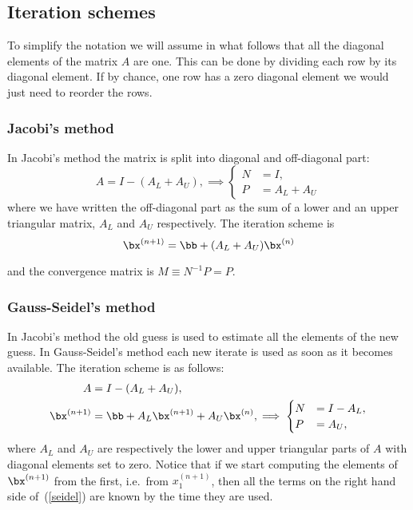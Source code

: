 \subsection{Iteration schemes}

To simplify the notation we will assume in what follows that all the
diagonal elements of the matrix $A$ are one.   This can be done by
dividing each row by its diagonal element.   If by chance, one row has
a zero diagonal element we would just need to reorder the rows.

\subsubsection{Jacobi's method}

In Jacobi's method the matrix is split into diagonal and off-diagonal
part:
%
\begin{equation*}
  A = I - ( A_L + A_U ) , \implies
  \begin{cases}
    N &= I , \\ P &= A_L+A_U
  \end{cases}
\end{equation*}
%
where we have written the off-diagonal part as the sum of a lower and
an upper triangular matrix, $A_L$ and $A_U$ respectively.   The iteration
scheme is
%
\begin{equation*}
  \bx^{(n+1)} = \bb + ( A_L + A_U ) \bx^{(n)}
\end{equation*}

%
and the convergence matrix is $M \equiv N^{-1} P = P$.

\subsubsection{Gauss-Seidel's method}

In Jacobi's method the old guess is used to estimate all the
elements of the new guess.   In Gauss-Seidel's method each new iterate
is used as soon as it becomes available.    The iteration scheme is as
follows:
%
\begin{align}
  A &= I - (A_L+A_U) , \nonumber \\
  \bx^{(n+1)} &= \bb + A_L \bx^{(n+1)} + A_U \bx^{(n)} , \implies
  \begin{cases}
    N &= I - A_L , \\ P &= A_U ,
  \end{cases}
  \label{seidel}
\end{align}
%
where $A_L$ and $A_U$ are respectively the  lower and upper triangular
parts of $A$ with diagonal elements  set to zero.   Notice that if we
start computing  the   elements   of $\bx^{(n+1)}$ from     the first,
i.e.\ from  $x_1^{(n+1)}$, then all the  terms  on the  right hand side
of~(\ref{seidel}) are known by the time they are used.

